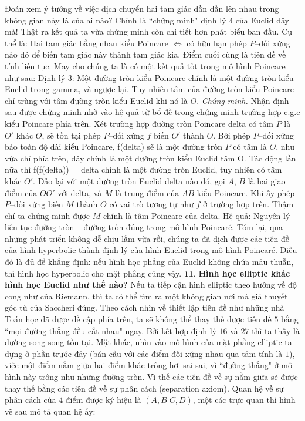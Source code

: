 \begin{multicols}{2}
	\vskip 0.1cm
	Đoán xem ý tưởng về việc dịch chuyển hai tam giác dần dần lên nhau trong không gian này là của ai nào? Chính là ``chứng minh" định lý $4$ của Euclid đây mà!
	Thật ra kết quả ta vừa chứng minh còn chi tiết hơn phát biểu ban đầu. Cụ thể là:
	\vskip 0.1cm
	Hai tam giác bằng nhau kiểu Poincare $\Leftrightarrow$ có hữu hạn phép $P$--đối xứng nào đó để biến tam giác này thành tam giác kia.
	\vskip 0.1cm
	Điểm cuối cùng là tiên đề về tính liên tục. May cho chúng ta là có một kết quả tốt trong mô hình Poincare như sau:
	\vskip 0.1cm
	Định lý $3$: Một đường tròn kiểu Poincare chính là một đường tròn kiểu Euclid trong gamma, và ngược lại. Tuy nhiên tâm của đường tròn kiểu Poincare chỉ trùng với tâm đường tròn kiểu Euclid khi nó là $O$.
	\vskip 0.1cm
	\textit{Chứng minh.} Nhận định sau được chứng minh nhờ vào hệ quả từ bổ đề trong chứng minh trường hợp c.g.c kiểu Poincare phía trên. 
	Xét trường hợp đường tròn Poincare delta có tâm $P$ là $O'$ khác $O$, sẽ tồn tại phép $P$--đối xứng $f$ biến $O'$ thành $O$. Bởi phép $P$--đối xứng bảo toàn độ dài kiểu Poincare, f(delta) sẽ là một đường tròn $P$ có tâm là $O$, như vừa chỉ phía trên, đây chính là một đường tròn kiểu Euclid tâm O. Tác động lần nữa thì f(f(delta)) = delta chính là một đường tròn Euclid, tuy nhiên có tâm khác $O'$.
	\vskip 0.1cm
	Đảo lại với một đường tròn Euclid delta nào đó, gọi $A$, $B$ là hai giao điểm của $OO'$ với delta, và $M$ là trung điểm của $AB$ kiểu Poincare. Khi ấy phép $P$--đối xứng biến $M$ thành $O$ có vai trò tương tự như $f$ ở trường hợp trên. Thậm chí ta chứng minh được $M$ chính là tâm Poincare của delta.
	\vskip 0.1cm
	Hệ quả: Nguyên lý liên tục đường tròn -- đường tròn đúng trong mô hình Poincaré.
	\vskip 0.1cm
	Tóm lại, qua những phát triển không dễ chịu lắm vừa rồi, chúng ta đã dịch được các tiên đề của hình hyperbolic thành định lý của hình Euclid trong mô hình Poincaré. Điều đó là đủ để khẳng định: nếu hình học phẳng của Euclid không chứa mâu thuẫn, thì hình học hyperbolic cho mặt phẳng cũng vậy.
	\vskip 0.1cm	
	$\pmb{11.}$ \textbf{\color{lichsutoanhoc}Hình học elliptic khác hình học Euclid như thế nào?}
	\vskip 0.1cm
	Nếu ta tiếp cận hình elliptic theo hướng về độ cong như của Riemann, thì ta có thể tìm ra một không gian nơi mà giả thuyết góc tù của Saccheri đúng. Theo cách nhìn về thiết lập tiên đề như những nhà Toán học đã được đề cập phía trên, ta sẽ không thể thay thế được tiên đề $5$ bằng ``mọi đường thẳng đều cắt nhau" ngay. Bởi kết hợp định lý $16$ và $27$ thì ta thấy là đường song song tồn tại. Mặt khác, nhìn vào mô hình của mặt phẳng elliptic ta dựng ở phần trước đây (bán cầu với các điểm đối xứng nhau qua tâm tính là $1$), việc một điểm nằm giữa hai điểm khác trông hơi sai sai, vì ``đường thẳng" ở mô hình này trông như những đường tròn. Vì thế các tiên đề về sự nằm giữa sẽ được thay thế bằng các tiên đề về sự phân cách (separation axiom). Quan hệ về sự phân cách của $4$ điểm được ký hiệu là $(A, B | C, D)$, một các trực quan thì hình vẽ sau mô tả quan hệ ấy:

\end{multicols}
